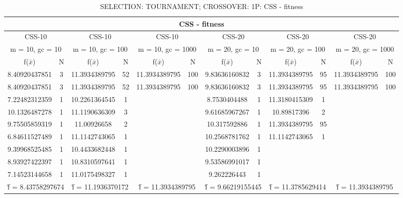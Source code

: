 \begin{table}[H]
	\centering
	\caption{SELECTION: TOURNAMENT; CROSSOVER: 1P: CSS - fitness}
	\begin{adjustbox}{width=1\textwidth}
		\begin{tabular}{ |c|c||c|c||c|c||c|c||c|c||c|c| }
			\hline
			\multicolumn{12}{|c|}{CSS - fitness} \\
			\hline
			\multicolumn{2}{|c||}{CSS-10} & \multicolumn{2}{c||}{CSS-10} & \multicolumn{2}{c||}{CSS-10} & \multicolumn{2}{c||}{CSS-20} & \multicolumn{2}{c||}{CSS-20} & \multicolumn{2}{c|}{CSS-20}\\
			\hline
			\multicolumn{2}{|c||}{m = 10, gc = 10} & \multicolumn{2}{c||}{m = 10, gc = 100} & \multicolumn{2}{c||}{m = 10, gc = 1000} & \multicolumn{2}{c||}{m = 20, gc = 10} & \multicolumn{2}{c||}{m = 20, gc = 100} & \multicolumn{2}{c|}{m = 20, gc = 1000}\\
			\hline
			f($\bar{x}$) & N & f($\bar{x}$) & N & f($\bar{x}$) & N & f($\bar{x}$) & N & f($\bar{x}$) & N & f($\bar{x}$) & N\\
			\hline
			\hline
			8.40920437851 & 3 & 11.3934389795 & 52 & 11.3934389795 & 100 & 9.83636160832 & 3 & 11.3934389795 & 95 & 11.3934389795 & 100\\
			\hline
			8.40920437851 & 3 & 11.3934389795 & 52 & 11.3934389795 & 100 & 9.83636160832 & 3 & 11.3934389795 & 95 & 11.3934389795 & 100\\
			7.22482312359 & 1 & 10.2261364545 & 1 &   &   & 8.7530404488 & 1 & 11.3180415309 & 1 &   &  \\
			10.1326487278 & 1 & 11.1190636309 & 3 &   &   & 9.61685967267 & 1 & 10.89817396 & 2 &   &  \\
			9.75505859319 & 1 & 11.00926658 & 2 &   &   & 10.317592886 & 1 & 11.3934389795 & 95 &   &  \\
			6.84611527489 & 1 & 11.1142743065 & 1 &   &   & 10.2568781762 & 1 & 11.1142743065 & 1 &   &  \\
			9.39968525485 & 1 & 10.4433682448 & 1 &   &   & 10.2290003896 & 1 &   &   &   &  \\
			8.93927422397 & 1 & 10.8310597641 & 1 &   &   & 9.53586991017 & 1 &   &   &   &  \\
			7.14523144658 & 1 & 11.0175498327 & 1 &   &   & 9.262226443 & 1 &   &   &   &  \\
			\hline
			\multicolumn{2}{|c||}{\^{f} = 8.43758297674} & \multicolumn{2}{c||}{\^{f} = 11.1936370172} & \multicolumn{2}{c||}{\^{f} = 11.3934389795} & \multicolumn{2}{c||}{\^{f} = 9.66219155445} & \multicolumn{2}{c||}{\^{f} = 11.3785629414} & \multicolumn{2}{c|}{\^{f} = 11.3934389795}\\
			\hline
		\end{tabular}
	\end{adjustbox}
\end{table}
